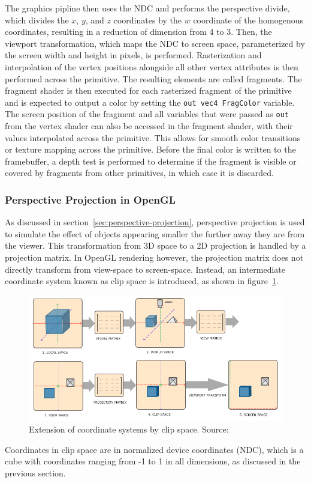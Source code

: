 The graphics pipline then uses the NDC and performs the perspective divide,
which divides the $x$, $y$, and $z$ coordinates by the $w$ coordinate of the homogenous coordinates,
resulting in a reduction of dimension from 4 to 3.
Then, the viewport transformation, which maps the NDC to screen space,
parameterized by the screen width and height in pixels, is performed.
Rasterization and interpolation of the vertex positions alongside all other vertex attributes
is then performed across the primitive.
The resulting elements are called fragments.
The fragment shader is then executed for each rasterized fragment of the primitive and is expected to
output a color by setting the \texttt{out vec4 FragColor} variable.
The screen position of the fragment and all variables that were passed as \texttt{out} from the
vertex shader can also be accessed in the fragment shader, with their values interpolated across the primitive.
This allows for smooth color transitions or texture mapping across the primitive.
Before the final color is written to the framebuffer,
a depth test is performed to determine if the fragment is visible or covered by fragments from other primitives,
in which case it is discarded.


\subsubsection{Perspective Projection in OpenGL}

As discussed in section~\ref{sec:perspective-projection}, perspective projection is used
to simulate the effect of objects appearing smaller the further away they are from the viewer.
This transformation from 3D space to a 2D projection is handled by a projection matrix.
In OpenGL rendering however, the projection matrix does not directly transform from view-space to screen-space.
Instead, an intermediate coordinate system known as clip space is introduced, as shown in figure~\ref{fig:coordinate-systems-with-clip-space}.
\begin{figure}[h!]
    \centering
    \includegraphics[width=0.85\linewidth]{images/coordinate_systems}
    \caption{Extension of coordinate systems by clip space. Source: \cite{de_vries_learn_2020}}
    \label{fig:coordinate-systems-with-clip-space}
\end{figure}
Coordinates in clip space are in normalized device coordinates (NDC), which is a cube
with coordinates ranging from -1 to 1 in all dimensions, as discussed in the previous section.

